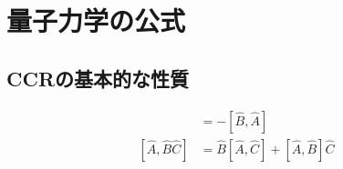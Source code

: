 \appendix
\renewcommand{\theequation}{A.\arabic{section}.\arabic{equation}}
\setcounter{equation}{0}

\section{量子力学の公式}
\subsection{CCRの基本的な性質}
\begin{align}
    [\hat{A}, \hat{B}] &= - [\hat{B}, \hat{A}]
\\
    [\hat{A}, \hat{B}\hat{C}]
   &=
   \hat{B}[\hat{A}, \hat{C}]
+
    [\hat{A}, \hat{B}] \hat{C}
\label{A,BC to B(A,C) + (A,B)C}
\end{align}
